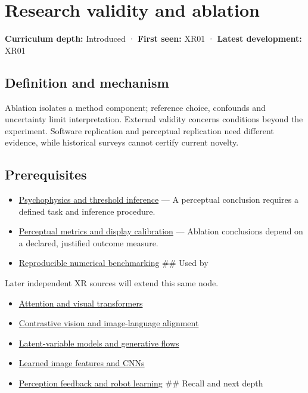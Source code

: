 \hypertarget{appendix-65788587ef78}{}\label{referencestart:appendix-65788587ef78}
\section{Research validity and ablation}\label{appendix-65788587ef78-research-validity-and-ablation}

\textbf{Curriculum depth:} Introduced · \textbf{First seen:} XR01 · \textbf{Latest development:} XR01

\subsection{Definition and mechanism}\label{appendix-65788587ef78-definition-and-mechanism}

Ablation isolates a method component; reference choice, confounds and uncertainty limit interpretation. External validity concerns conditions beyond the experiment. Software replication and perceptual replication need different evidence, while historical surveys cannot certify current novelty.

\subsection{Prerequisites}\label{appendix-65788587ef78-prerequisites}

\begin{itemize}
\item
  \hyperref[appendix-1759f03e8ce7]{Psychophysics and threshold inference} --- A perceptual conclusion requires a defined task and inference procedure.
\item
  \hyperref[appendix-b2c1846508bf]{Perceptual metrics and display calibration} --- Ablation conclusions depend on a declared, justified outcome measure.
\item
  \hyperref[appendix-b9db93e28371]{Reproducible numerical benchmarking} \#\# Used by
\end{itemize}

Later independent XR sources will extend this same node.

\begin{itemize}
\tightlist
\item
  \hyperref[appendix-a9d5dfdd164a]{Attention and visual transformers}
\item
  \hyperref[appendix-772f1fd96148]{Contrastive vision and image-language alignment}
\item
  \hyperref[appendix-2c568f05ee34]{Latent-variable models and generative flows}
\item
  \hyperref[appendix-47c51ea026fb]{Learned image features and CNNs}
\item
  \hyperref[appendix-b0c42da325f1]{Perception feedback and robot learning} \#\# Recall and next depth
\end{itemize}

